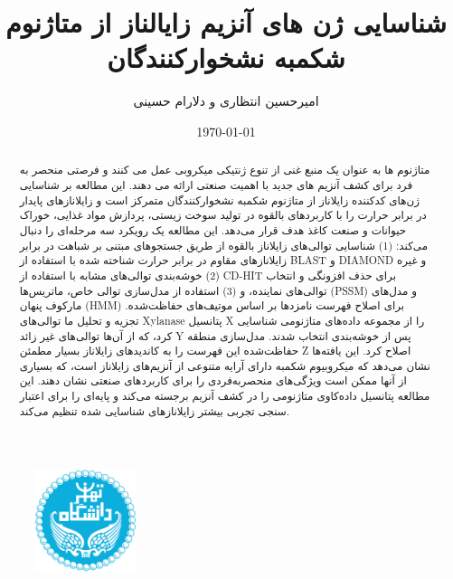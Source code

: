 \documentclass[11pt]{report}
\title{شناسایی ژن های آنزیم زایالناز از متاژنوم شکمبه نشخوارکنندگان}
\author{امیرحسین انتظاری و دلارام حسینی}
\date{\today}
\begin{document}
\begin{figure}
    \centering \includegraphics[height=3cm]{images/Logo.png}
\end{figure}
\renewcommand{\chaptername}{بخش}
\newpage
\maketitle
\newpage

    \begin{abstract}
      متاژنوم ها به عنوان یک منبع غنی از تنوع ژنتیکی میکروبی عمل می کنند و فرصتی منحصر به فرد برای کشف آنزیم های جدید با اهمیت صنعتی ارائه می دهند. این مطالعه بر شناسایی ژن‌های کدکننده زایلاناز از متاژنوم شکمبه نشخوارکنندگان متمرکز است و زایلانازهای پایدار در برابر حرارت را با کاربردهای بالقوه در تولید سوخت زیستی، پردازش مواد غذایی، خوراک حیوانات و صنعت کاغذ هدف قرار می‌دهد.
      این مطالعه یک رویکرد سه مرحله‌ای را دنبال می‌کند: 
      (1) 
      شناسایی توالی‌های زایلاناز بالقوه از طریق جستجوهای مبتنی بر شباهت در برابر زایلانازهای مقاوم در برابر حرارت شناخته شده با استفاده از BLAST و DIAMOND و غیره
      (2) 
      خوشه‌بندی توالی‌های مشابه با استفاده از 
      CD-HIT 
      برای حذف افزونگی و انتخاب توالی‌های نماینده، و 
      (3) 
      استفاده از مدل‌سازی توالی خاص، ماتریس‌ها 
      (PSSM) 
      و مدل‌های مارکوف پنهان 
      (HMM) 
      برای اصلاح فهرست نامزدها بر اساس موتیف‌های حفاظت‌شده.
      تجزیه و تحلیل ما توالی‌های 
      Xylanase 
      پتانسیل 
      X 
      را از مجموعه داده‌های متاژنومی شناسایی کرد، که از آن‌ها توالی‌های غیر زائد 
      Y 
      پس از خوشه‌بندی انتخاب شدند. مدل‌سازی منطقه حفاظت‌شده این فهرست را به کاندیدهای زایلاناز بسیار مطمئن 
      Z 
      اصلاح کرد. این یافته‌ها نشان می‌دهد که میکروبیوم شکمبه دارای آرایه متنوعی از آنزیم‌های زایلاناز است، که بسیاری از آنها ممکن است ویژگی‌های منحصربه‌فردی را برای کاربردهای صنعتی نشان دهند. این مطالعه پتانسیل داده‌کاوی متاژنومی را در کشف آنزیم برجسته می‌کند و پایه‌ای را برای اعتبار سنجی تجربی بیشتر زایلانازهای شناسایی شده تنظیم می‌کند.
        \end{abstract}
\restoregeometry


\newpage

\newpage

\newpage


\end{document}
